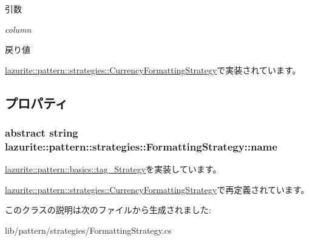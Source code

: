 \begin{DoxyParams}{引数}
\item[{\em column}]\end{DoxyParams}
\begin{DoxyReturn}{戻り値}

\end{DoxyReturn}


\hyperlink{classlazurite_1_1pattern_1_1strategies_1_1_currency_formatting_strategy_a72ff3e13e9da631c30822649a7ccea43}{lazurite::pattern::strategies::CurrencyFormattingStrategy}で実装されています。

\subsection{プロパティ}
\hypertarget{classlazurite_1_1pattern_1_1strategies_1_1_formatting_strategy_a038a894580ec88e41ae22efead88c6e9}{
\subsubsection[{name}]{\setlength{\rightskip}{0pt plus 5cm}abstract string lazurite::pattern::strategies::FormattingStrategy::name}}
\label{classlazurite_1_1pattern_1_1strategies_1_1_formatting_strategy_a038a894580ec88e41ae22efead88c6e9}


\hyperlink{interfacelazurite_1_1pattern_1_1basics_1_1tag___strategy_a0c5fea8c84f0ff805895bacd78d1f256}{lazurite::pattern::basics::tag\_\-Strategy}を実装しています。

\hyperlink{classlazurite_1_1pattern_1_1strategies_1_1_currency_formatting_strategy_a507841259b13c733d09c2f747e81b8d5}{lazurite::pattern::strategies::CurrencyFormattingStrategy}で再定義されています。

このクラスの説明は次のファイルから生成されました:\begin{DoxyCompactItemize}
\item 
lib/pattern/strategies/FormattingStrategy.cs\end{DoxyCompactItemize}

